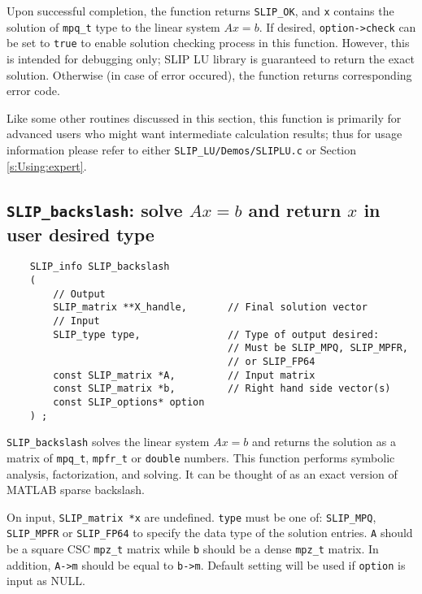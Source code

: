 \documentclass[12pt]{article}
\theoremstyle{definition}
\begin{document}
Upon successful completion, the function returns \verb|SLIP_OK|, and
\verb|x| contains the solution of \verb|mpq_t| type to the
linear system $Ax=b$. If desired, \verb|option->check|
can be set to \verb|true| to enable solution checking process in this function.
However, this is intended for debugging only; SLIP LU library is guaranteed to
return the exact solution. Otherwise (in case of error occured), the function
returns corresponding error code.

Like some other routines discussed in this section, this
function is primarily for advanced users who might want intermediate
calculation results; thus for usage information please refer to either
\verb|SLIP_LU/Demos/SLIPLU.c| or Section \ref{s:Using:expert}.


\cprotect\subsection{\verb|SLIP_backslash|: solve $Ax=b$ and return $x$ in user desired type}
\label{ss:SLIP_backslash}

\begin{mdframed}[userdefinedwidth=6in]
{\footnotesize
\begin{verbatim}
    SLIP_info SLIP_backslash
    (
        // Output
        SLIP_matrix **X_handle,       // Final solution vector
        // Input
        SLIP_type type,               // Type of output desired:
                                      // Must be SLIP_MPQ, SLIP_MPFR,
                                      // or SLIP_FP64
        const SLIP_matrix *A,         // Input matrix
        const SLIP_matrix *b,         // Right hand side vector(s)
        const SLIP_options* option
    ) ;
\end{verbatim}
} \end{mdframed}

\verb|SLIP_backslash| solves the linear system $Ax=b$ and returns the solution
as a matrix of \verb|mpq_t|, \verb|mpfr_t| or \verb|double| numbers. This
function performs symbolic analysis, factorization, and solving. It can be
thought of as an exact version of MATLAB sparse backslash.

On input, \verb|SLIP_matrix *x| are undefined. \verb|type| must be one of:
\verb|SLIP_MPQ|, \verb|SLIP_MPFR| or \verb|SLIP_FP64| to specify the data type
of the solution entries. \verb|A| should be a square CSC \verb|mpz_t| matrix
while \verb|b| should be a dense \verb|mpz_t| matrix. In addition, \verb|A->m|
should be equal to \verb|b->m|.  Default setting will be used if
\verb|option| is input as NULL.
\end{document}
